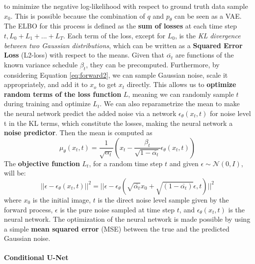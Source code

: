 \documentclass[preprint]{elsarticle}
\begin{document}
to minimize the negative log-likelihood with respect to ground truth data sample $x_0$.
This is possible because the combination of $q$ and $p_\theta$ can be seen as a VAE.
The ELBO for this process is defined as the \textbf{sum of losses} at each time step $t,L_0+L_1+...+L_T$.
Each term of the loss, except for $L_0$, is the \emph{KL divergence between two Gaussian distributions},
which can be written as a \textbf{Squared Error Loss} (L2-loss) with respect to the means.
Given that $\bar{\alpha_t}$ are functions of the known variance schedule $\beta_t$, they can be precomputed.
Furthermore, by considering Equation \ref{eq:forward2}, we can sample Gaussian noise, 
scale it appropriately, and add it to $x_o$ to  get $x_t$ directly. This allows us
to \textbf{optimize random terms of the loss function} $L$, meaning we can randomly sample $t$ during training
and optimize $L_t$.
We can also reparametrize the mean to make the neural network predict
the added noise via a network $\epsilon_\theta(x_t,t)$ for noise level t in the KL terms, which
constitute the losses, making the neural network a \textbf{noise predictor}.
Then the mean is computed as \cite{weng2021diffusion}
\begin{equation}
	\mu_\theta(x_t,t) =\frac{1}{\sqrt{\alpha_t}}\left(x_t - \frac{\beta_t}{\sqrt{1-\bar{\alpha_t}}}\epsilon_\theta(x_t,t)\right)
\end{equation}
The \textbf{objective function} $L_t$, for a random time step $t$ and given $\epsilon \sim \mathcal{N}(0,I)$,
will be:
\begin{equation}
	||\epsilon-\epsilon_\theta(x_t,t)||^2 = ||\epsilon - \epsilon_\theta
	(\sqrt{\bar{\alpha_t}}x_0 + \sqrt{(1-\bar{\alpha_t})}\epsilon,t) ||^2
\end{equation}
where $x_0$ is the initial image, $t$ is the direct noise level sample given by the
forward process, $\epsilon$ is the pure noise sampled at time step $t$, and 
$\epsilon_\theta(x_t,t)$ is the neural network. The optimization of the neural network is made possible 
by using a simple \textbf{mean squared error} (MSE) between the true and the predicted Gaussian noise.



\paragraph{Conditional U-Net}
\end{document}
